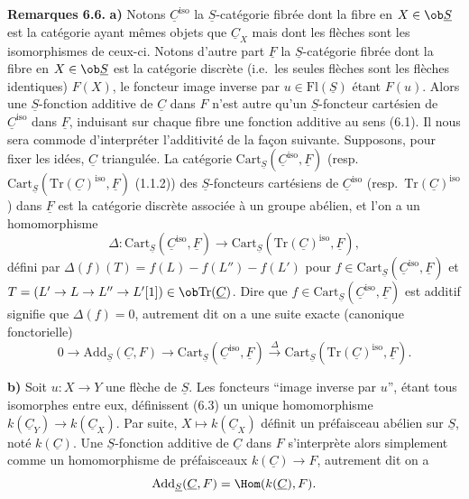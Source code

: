 \textbf{Remarques 6.6.}
\textbf{a)} Notons $\underline{C}^{\mathrm{iso}}$ la $\underline{S}$-catégorie fibrée dont la fibre en $X \in \ob \underline{S}$ est la catégorie ayant mêmes objets que $\underline{C}_X$ mais dont les flèches sont les isomorphismes de ceux-ci. Notons d'autre part $\underline{F}$ la $\underline{S}$-catégorie fibrée dont la fibre en $X \in \ob \underline{S}$ est la catégorie discrète (i.e.\ les seules flèches sont les flèches identiques) $F(X)$, le foncteur image inverse par $u \in \mathrm{Fl}(\underline{S})$ étant $F(u)$. Alors une $\underline{S}$-fonction additive de $\underline{C}$ dans $F$ n'est autre qu'un $\underline{S}$-foncteur cartésien de $\underline{C}^{\mathrm{iso}}$ dans $\underline{F}$, induisant sur chaque fibre une fonction additive au sens (6.1). Il nous sera commode d'interpréter l'additivité de la façon suivante. Supposons, pour fixer les idées, $\underline{C}$ triangulée. La catégorie $\mathrm{Cart}_{\underline{S}}(\underline{C}^{\mathrm{iso}}, \underline{F})$ (resp.\ $\mathrm{Cart}_{\underline{S}}(\mathrm{Tr}(\underline{C})^{\mathrm{iso}}, \underline{F})$ (1.1.2)) des $\underline{S}$-foncteurs cartésiens de $\underline{C}^{\mathrm{iso}}$ (resp.\ $\mathrm{Tr}(\underline{C})^{\mathrm{iso}}$) dans $\underline{F}$ est la catégorie discrète associée à un groupe abélien, et l'on a un homomorphisme
\[
\Delta : \mathrm{Cart}_{\underline{S}}(\underline{C}^{\mathrm{iso}}, \underline{F}) \longrightarrow \mathrm{Cart}_{\underline{S}}(\mathrm{Tr}(\underline{C})^{\mathrm{iso}}, \underline{F}),
\]
défini par $\Delta(f)(T) = f(L) - f(L'') - f(L')$ pour $f \in \mathrm{Cart}_{\underline{S}}(\underline{C}^{\mathrm{iso}}, \underline{F})$ et $T = (L' \to L \to L'' \to L'[1]) \in \ob \mathrm{Tr}(\underline{C})$. Dire que $f \in \mathrm{Cart}_{\underline{S}}(\underline{C}^{\mathrm{iso}}, \underline{F})$ est additif signifie que $\Delta(f) = 0$, autrement dit on a une suite exacte (canonique fonctorielle)
\[
0 \longrightarrow \mathrm{Add}_{\underline{S}}(\underline{C}, F) \longrightarrow \mathrm{Cart}_{\underline{S}}(\underline{C}^{\mathrm{iso}}, \underline{F}) \xrightarrow{\Delta} \mathrm{Cart}_{\underline{S}}(\mathrm{Tr}(\underline{C})^{\mathrm{iso}}, \underline{F}). \tag{6.6.1}
\]

\textbf{b)} Soit $u : X \to Y$ une flèche de $\underline{S}$. Les foncteurs ``image inverse par $u$'', étant tous isomorphes entre eux, définissent (6.3) un unique homomorphisme $k(\underline{C}_Y) \to k(\underline{C}_X)$. Par suite, $X \mapsto k(\underline{C}_X)$ définit un préfaisceau abélien sur $\underline{S}$, noté $k(\underline{C})$. Une $\underline{S}$-fonction additive de $\underline{C}$ dans $F$ s'interprète alors simplement comme un homomorphisme de préfaisceaux $k(\underline{C}) \to F$, autrement dit on a
\[
\mathrm{Add}_{\underline{S}}(\underline{C}, F) = \Hom(k(\underline{C}), F).
\]

